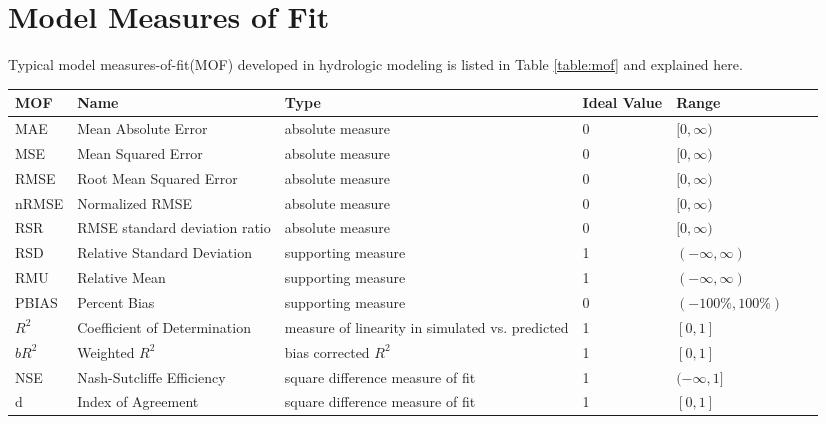 \chapter{Model Measures of Fit} \label{d:mof}

Typical model measures-of-fit(MOF) developed in hydrologic modeling is listed in Table \ref{table:mof} and explained here.  

\begingroup
	\renewcommand{\arraystretch}{1.2} 
	\linespread{1.0}
	\footnotesize 
	\centering
	\newcolumntype{R}{>{\raggedleft\arraybackslash}}
	\begin{longtable}[h]{p{1.25cm}p{4.45cm}p{5cm}Rp{1.55cm}Rp{2.25cm}}
	\toprule
	MOF & Name & Type & Ideal Value & Range \\
	\midrule
	\endhead
	MAE & Mean Absolute Error & absolute measure & 0 & $[0 , \infty)$ \\
	MSE & Mean Squared Error & absolute measure & 0 & $[0 , \infty)$ \\
	RMSE & Root Mean Squared Error & absolute measure & 0 & $[0 , \infty)$ \\
	nRMSE & Normalized RMSE & absolute measure & 0 & $[0 , \infty)$ \\
	RSR & RMSE standard deviation ratio & absolute measure & 0 & $[0 , \infty)$ \\
	\midrule
	RSD & Relative Standard Deviation & supporting measure & 1 & $(-\infty , \infty)$ \\
	RMU & Relative Mean & supporting measure & 1 & $(-\infty , \infty)$ \\
	PBIAS & Percent Bias & supporting measure & 0 & $(-100\% , 100\%)$ \\
	\midrule
	$R^2$ & Coefficient of Determination & measure of linearity in simulated vs. predicted & 1 & $[0 , 1]$ \\
	$bR^2$ & Weighted $R^2$ & bias corrected $R^2$ & 1 & $[0 , 1]$ \\
	NSE & Nash-Sutcliffe Efficiency & square difference measure of fit & 1 & $(-\infty , 1]$ \\
	d & Index of Agreement & square difference measure of fit & 1 & $[0 , 1]$ \\

\end{longtable}
